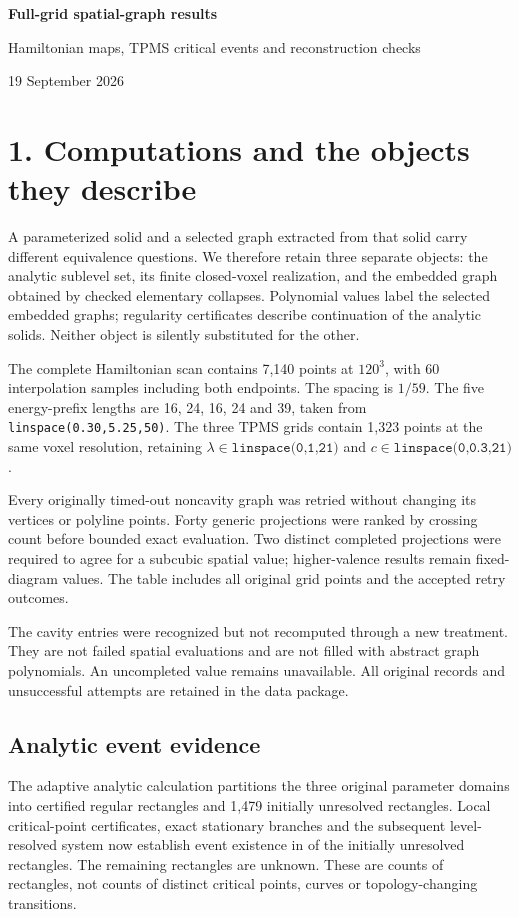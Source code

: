 \documentclass[10pt,a4paper]{article}
\begin{document}
{\LARGE\bfseries Full-grid spatial-graph results\par}
{\large Hamiltonian maps, TPMS critical events and reconstruction checks\par}
19 September 2026

\section*{1. Computations and the objects they describe}
A parameterized solid and a selected graph extracted from that solid carry different equivalence questions. We therefore retain three separate objects: the analytic sublevel set, its finite closed-voxel realization, and the embedded graph obtained by checked elementary collapses. Polynomial values label the selected embedded graphs; regularity certificates describe continuation of the analytic solids. Neither object is silently substituted for the other.

The complete Hamiltonian scan contains 7,140 points at $120^3$, with 60 interpolation samples including both endpoints. The spacing is $1/59$. The five energy-prefix lengths are 16, 24, 16, 24 and 39, taken from \texttt{linspace(0.30,5.25,50)}. The three TPMS grids contain 1,323 points at the same voxel resolution, retaining $\lambda\in\texttt{linspace(0,1,21)}$ and $c\in\texttt{linspace(0,0.3,21)}$.

Every originally timed-out noncavity graph was retried without changing its vertices or polyline points. Forty generic projections were ranked by crossing count before bounded exact evaluation. Two distinct completed projections were required to agree for a subcubic spatial value; higher-valence results remain fixed-diagram values. The table includes all original grid points and the accepted retry outcomes.

\begin{center}\end{center}

The cavity entries were recognized but not recomputed through a new treatment. They are not failed spatial evaluations and are not filled with abstract graph polynomials. An uncompleted value remains unavailable. All original records and unsuccessful attempts are retained in the data package.

\subsection*{Analytic event evidence}
The adaptive analytic calculation partitions the three original parameter domains into \RegularLeaves{} certified regular rectangles and 1,479 initially unresolved rectangles. Local critical-point certificates, exact stationary branches and the subsequent level-resolved system now establish event existence in \EventCells{} of the initially unresolved rectangles. The remaining \UnknownCells{} rectangles are unknown. These are counts of rectangles, not counts of distinct critical points, curves or topology-changing transitions.
\end{document}
